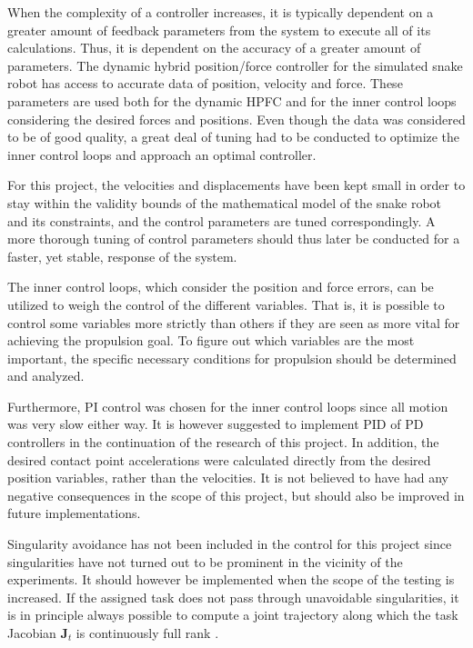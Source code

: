 When the complexity of a controller increases, it is typically dependent on a greater amount of feedback parameters from the system to execute all of its calculations. Thus, it is dependent on the accuracy of a greater amount of parameters. The dynamic hybrid position/force controller for the simulated snake robot has access to accurate data of position, velocity and force. These parameters are used both for the dynamic HPFC and for the inner control loops considering the desired forces and positions. Even though the data was considered to be of good quality, a great deal of tuning had to be conducted to optimize the inner control loops and approach an optimal controller. 

For this project, the velocities and displacements have been kept small in order to stay within the validity bounds of the mathematical model of the snake robot and its constraints, and the control parameters are tuned correspondingly. A more thorough tuning of control parameters should thus later be conducted for a faster, yet stable, response of the system.

The inner control loops, which consider the position and force errors, can be utilized to weigh the control of the different variables. That is, it is possible to control some variables more strictly than others if they are seen as more vital for achieving the propulsion goal. To figure out which variables are the most important, the specific necessary conditions for propulsion should be determined and analyzed.

Furthermore, PI control was chosen for the inner control loops since all motion was very slow either way. It is however suggested to implement PID of PD controllers in the continuation of the research of this project. In addition, the desired contact point accelerations were calculated directly from the desired position variables, rather than the velocities. It is not believed to have had any negative consequences in the scope of this project, but should also be improved in future implementations.

Singularity avoidance has not been included in the control for this project since singularities have not turned out to be prominent in the vicinity of the experiments. It should however be implemented when the scope of the testing is increased. If the assigned task does not pass through unavoidable singularities, it is in principle always possible to compute a joint trajectory along which the task Jacobian $\mathbf{J}_t$ is continuously full rank \cite{chiaverini2008kinematically}.

